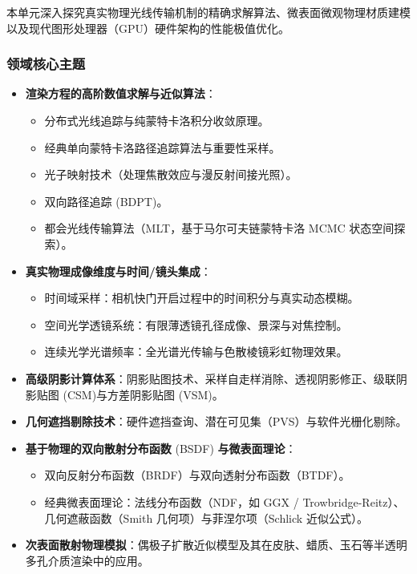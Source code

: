 本单元深入探究真实物理光线传输机制的精确求解算法、微表面微观物理材质建模以及现代图形处理器（GPU）硬件架构的性能极值优化。

\subsubsection{领域核心主题}
\begin{itemize}
    \item \textbf{渲染方程的高阶数值求解与近似算法}：
    \begin{itemize}
        \item 分布式光线追踪与纯蒙特卡洛积分收敛原理。
        \item 经典单向蒙特卡洛路径追踪算法与重要性采样。
        \item 光子映射技术（处理焦散效应与漫反射间接光照）。
        \item 双向路径追踪 (BDPT)。
        \item 都会光线传输算法（MLT，基于马尔可夫链蒙特卡洛 MCMC 状态空间探索）。
    \end{itemize}
    \item \textbf{真实物理成像维度与时间/镜头集成}：
    \begin{itemize}
        \item 时间域采样：相机快门开启过程中的时间积分与真实动态模糊。
        \item 空间光学透镜系统：有限薄透镜孔径成像、景深与对焦控制。
        \item 连续光学光谱频率：全光谱光传输与色散棱镜彩虹物理效果。
    \end{itemize}
    \item \textbf{高级阴影计算体系}：阴影贴图技术、采样自走样消除、透视阴影修正、级联阴影贴图 (CSM)与方差阴影贴图 (VSM)。
    \item \textbf{几何遮挡剔除技术}：硬件遮挡查询、潜在可见集（PVS）与软件光栅化剔除。
    \item \textbf{基于物理的双向散射分布函数} (BSDF) \textbf{与微表面理论}：
    \begin{itemize}
        \item 双向反射分布函数（BRDF）与双向透射分布函数（BTDF）。
        \item 经典微表面理论：法线分布函数（NDF，如 GGX / Trowbridge-Reitz）、几何遮蔽函数（Smith 几何项）与菲涅尔项（Schlick 近似公式）。
    \end{itemize}
    \item \textbf{次表面散射物理模拟}：偶极子扩散近似模型及其在皮肤、蜡质、玉石等半透明多孔介质渲染中的应用。

\end{itemize}
